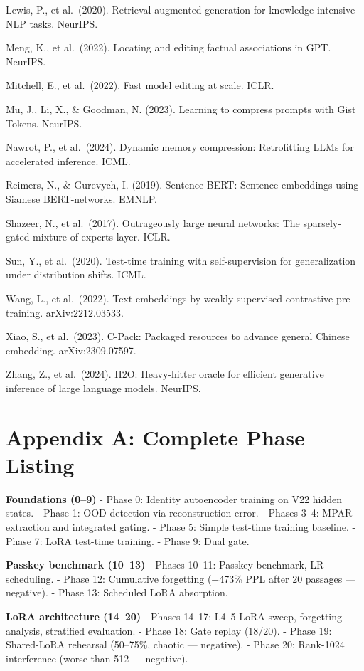 Lewis, P., et al.~(2020). Retrieval-augmented generation for knowledge-intensive NLP tasks. NeurIPS.

Meng, K., et al.~(2022). Locating and editing factual associations in GPT. NeurIPS.

Mitchell, E., et al.~(2022). Fast model editing at scale. ICLR.

Mu, J., Li, X., \& Goodman, N. (2023). Learning to compress prompts with Gist Tokens. NeurIPS.

Nawrot, P., et al.~(2024). Dynamic memory compression: Retrofitting LLMs for accelerated inference. ICML.

Reimers, N., \& Gurevych, I. (2019). Sentence-BERT: Sentence embeddings using Siamese BERT-networks. EMNLP.

Shazeer, N., et al.~(2017). Outrageously large neural networks: The sparsely-gated mixture-of-experts layer. ICLR.

Sun, Y., et al.~(2020). Test-time training with self-supervision for generalization under distribution shifts. ICML.

Wang, L., et al.~(2022). Text embeddings by weakly-supervised contrastive pre-training. arXiv:2212.03533.

Xiao, S., et al.~(2023). C-Pack: Packaged resources to advance general Chinese embedding. arXiv:2309.07597.

Zhang, Z., et al.~(2024). H2O: Heavy-hitter oracle for efficient generative inference of large language models. NeurIPS.

\section{Appendix A: Complete Phase Listing}\label{appendix-a-complete-phase-listing}

\textbf{Foundations (0--9)} - Phase 0: Identity autoencoder training on V22 hidden states. - Phase 1: OOD detection via reconstruction error. - Phases 3--4: MPAR extraction and integrated gating. - Phase 5: Simple test-time training baseline. - Phase 7: LoRA test-time training. - Phase 9: Dual gate.

\textbf{Passkey benchmark (10--13)} - Phases 10--11: Passkey benchmark, LR scheduling. - Phase 12: Cumulative forgetting (+473\% PPL after 20 passages --- negative). - Phase 13: Scheduled LoRA absorption.

\textbf{LoRA architecture (14--20)} - Phases 14--17: L4--5 LoRA sweep, forgetting analysis, stratified evaluation. - Phase 18: Gate replay (18/20). - Phase 19: Shared-LoRA rehearsal (50--75\%, chaotic --- negative). - Phase 20: Rank-1024 interference (worse than 512 --- negative).

